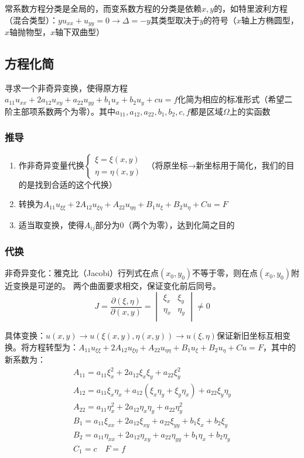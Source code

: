 常系数方程分类是全局的，而变系数方程的分类是依赖\(x,y\)的，如特里波利方程（混合类型）：\(yu_{xx}+u_{yy}=0\rightarrow\Delta=-y\)其类型取决于\(y\)的符号（\(x\)轴上方椭圆型，\(x\)轴抛物型，\(x\)轴下双曲型）

\subsection{方程化简}
寻求一个非奇异变换，使得原方程\(a_{11}u_{xx}+2a_{12}u_{xy}+a_{22}u_{yy}+b_1u_x+b_2u_y+cu=f\)化简为相应的标准形式（希望二阶主部项系数两个为零）。其中\(a_{11},a_{12},a_{22},b_1,b_2,c,f\)都是区域\(\Omega\)上的实函数

\subsubsection{推导}
\begin{enumerate}
	\item 作非奇异变量代换\(\begin{cases}\xi=\xi(x,y)\\\eta=\eta(x,y)\end{cases}\)	（将原坐标→新坐标用于简化，我们的目的是找到合适的这个代换）
	\item 转换为\(A_{11}u_{\xi\xi}+2A_{12}u_{\xi\eta}+A_{22}u_{\eta\eta}+B_1u_\xi+B_2u_\eta+Cu=F\)
	\item 适当取变换，使得\(A_{ij}\)部分为0（两个为零），达到化简之目的
\end{enumerate}

\subsubsection{代换}

非奇异变化：雅克比（Jacobi）行列式在点\((x_0,y_0)\)不等于零，则在点\((x_0,y_0)\)附近变换是可逆的。 两个曲面要求相交，保证变化前后同号。
\[
J=\frac{\partial(\xi,\eta)}{\partial(x,y)}=\begin{vmatrix}\xi_x&\xi_y\\\eta_x&\eta_y\\\end{vmatrix}\neq0
\]
					
具体变换：\(u(x,y)\rightarrow u(\xi(x,y),\eta(x,y))\rightarrow u(\xi,\eta)\)保证新旧坐标互相变换。将方程转型为：\(A_{11}u_{\xi\xi}+2A_{12}u_{\xi\eta}+A_{22}u_{\eta\eta}+B_1u_\xi+B_2u_\eta+Cu=F\)，其中的新系数为：
\begin{gather*}
A_{11}=a_{11}\xi_x^2+2a_{12}\xi_x\xi_y+a_{22}\xi_y^2\\
A_{12}=a_{11}\xi_x\eta_x+a_{12}\left(\xi_x\eta_y+\xi_y\eta_x\right)+a_{22}\xi_y\eta_y\\
A_{22}=a_{11}\eta_x^2+2a_{12}\eta_x\eta_y+a_{22}\eta_y^2\\
B_1=a_{11}\xi_{xx}+2a_{12}\xi_{xy}+a_{22}\xi_{yy}+b_1\xi_x+b_2\xi_y\\
B_2=a_{11}\eta_{xx}+2a_{12}\eta_{xy}+a_{22}\eta_{yy}+b_1\eta_x+b_2\eta_y\\
C_1=c\quad F=f  
\end{gather*}

